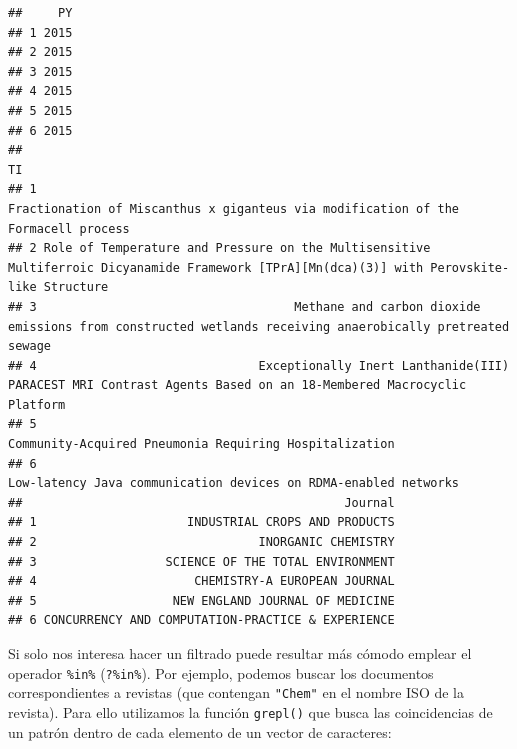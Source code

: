 \documentclass[
]{book}
\newenvironment{Shaded}{\begin{snugshade}}{\end{snugshade}}
\newcommand{\FunctionTok}[1]{\textcolor[rgb]{0.13,0.29,0.53}{\textbf{#1}}}
\newcommand{\NormalTok}[1]{#1}
\newcommand{\OtherTok}[1]{\textcolor[rgb]{0.56,0.35,0.01}{#1}}
\newcommand{\SpecialCharTok}[1]{\textcolor[rgb]{0.81,0.36,0.00}{\textbf{#1}}}
\newcommand{\StringTok}[1]{\textcolor[rgb]{0.31,0.60,0.02}{#1}}
\theoremstyle{break}
\theoremstyle{nonumberplain}
\begin{document}
\begin{verbatim}
##     PY
## 1 2015
## 2 2015
## 3 2015
## 4 2015
## 5 2015
## 6 2015
##                                                                                                                                            TI
## 1                                                           Fractionation of Miscanthus x giganteus via modification of the Formacell process
## 2 Role of Temperature and Pressure on the Multisensitive Multiferroic Dicyanamide Framework [TPrA][Mn(dca)(3)] with Perovskite-like Structure
## 3                                    Methane and carbon dioxide emissions from constructed wetlands receiving anaerobically pretreated sewage
## 4                               Exceptionally Inert Lanthanide(III) PARACEST MRI Contrast Agents Based on an 18-Membered Macrocyclic Platform
## 5                                                                                      Community-Acquired Pneumonia Requiring Hospitalization
## 6                                                                             Low-latency Java communication devices on RDMA-enabled networks
##                                             Journal
## 1                     INDUSTRIAL CROPS AND PRODUCTS
## 2                               INORGANIC CHEMISTRY
## 3                  SCIENCE OF THE TOTAL ENVIRONMENT
## 4                      CHEMISTRY-A EUROPEAN JOURNAL
## 5                   NEW ENGLAND JOURNAL OF MEDICINE
## 6 CONCURRENCY AND COMPUTATION-PRACTICE & EXPERIENCE
\end{verbatim}

Si solo nos interesa hacer un filtrado puede resultar más cómodo emplear
el operador \texttt{\%in\%} (\texttt{?\textquotesingle{}\%in\%\textquotesingle{}}).
Por ejemplo, podemos buscar los documentos correspondientes a revistas (que
contengan \texttt{"Chem"} en el nombre ISO de la revista).
Para ello utilizamos la función \texttt{grepl()} que busca las coincidencias de
un patrón dentro de cada elemento de un vector de caracteres:

\begin{Shaded}
\end{Shaded}
\end{document}
